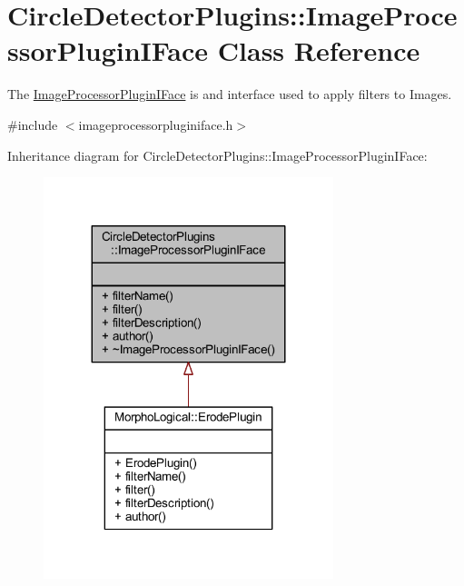 \hypertarget{class_circle_detector_plugins_1_1_image_processor_plugin_i_face}{}\section{Circle\+Detector\+Plugins\+:\+:Image\+Processor\+Plugin\+I\+Face Class Reference}
\label{class_circle_detector_plugins_1_1_image_processor_plugin_i_face}


The \hyperlink{class_circle_detector_plugins_1_1_image_processor_plugin_i_face}{Image\+Processor\+Plugin\+I\+Face} is and interface used to apply filters to Images.  




{\ttfamily \#include $<$imageprocessorpluginiface.\+h$>$}



Inheritance diagram for Circle\+Detector\+Plugins\+:\+:Image\+Processor\+Plugin\+I\+Face\+:\nopagebreak
\begin{figure}[H]
\begin{center}
\leavevmode
\includegraphics[width=239pt]{dc/dc8/class_circle_detector_plugins_1_1_image_processor_plugin_i_face__inherit__graph}
\end{center}
\end{figure}


